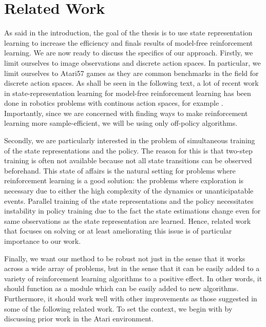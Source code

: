 \chapter{Related Work}
\label{ch-related-work}
As said in the introduction, the goal of the thesis is to use
state representation learning to increase the efficiency 
and finals results of model-free reinforcement learning.
We are now ready to discuss the specifics of our approach.
Firstly, we limit ourselves to image observations and discrete action spaces.
In particular, we limit ourselves to Atari57 games as they are common benchmarks in the field
for discrete action spaces.
As shall be seen in the following text, a lot of recent work in state-representation learning
for model-free reinforcement learning has been done in robotics problems with 
continous action spaces, for example \cite{sac+ae}. %
Importantly, since we are concerned with finding ways to make  reinforcement learning
more sample-efficient, we will be using only off-policy algorithms.

Secondly, we are particularly interested in the problem of simultaneous training
of the state representations and the policy.
The reason for this is that two-step training is often not available because not all
state transitions can be observed beforehand.
This state of affairs is the natural setting for problems where reinforcement learning
is a good solution: the problems where exploration is necessary due to
either the high complexity of the dynamics or unanticipatable events.
Parallel training of the state representations and the policy necessitates
instability in policy training due to the fact the state estimations
change even for same observations as the state representation are learned.
Hence, related work that focuses on solving or at least ameliorating this issue 
is of particular importance to our work.

Finally, we want our method to be robust not just in the sense that it works
across a wide array of problems, but in the sense that it can be 
easily added to a variety of reinforcement learning algorithms
to a positive effect. In other words, it should function as a module
which can be easily added to new algorithms.
Furthermore, it should work well with other improvements as those suggested
in some of the following related work.
To set the context, we begin with by discussing prior work in the Atari environment.
